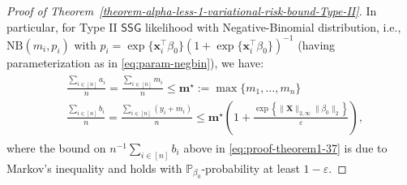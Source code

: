 \documentclass[12pt]{article}
\numberwithin{equation}{section}
\begin{document}
\begin{proof}[Proof of Theorem~\ref{theorem-alpha-less-1-variational-risk-bound-Type-II}]
In particular, for Type II $\mathsf{SSG}$ likelihood with Negative-Binomial distribution, i.e., $\mathrm{NB}(m_i, p_i)$ with $p_i = \exp\{\mathbf{x}_i^{\top}\beta_0\}(1 + \exp\{\mathbf{x}_i^{\top}\beta_0\})^{-1}$ (having parameterization as in \eqref{eq:param-negbin}), we have:
\begin{align}\label{eq:proof-theorem1-37}
    \begin{split}
        &\frac{\sum_{i\in[n]} a_i}{n} = \frac{\sum_{i\in [n]}m_i}{n} \leq \mathbf{m}^{\star} := \max\{m_1, \ldots, m_n\}\\
        &\frac{\sum_{i\in [n]}b_i}{n} = \frac{\sum_{i\in [n]}(y_i+m_i)}{n} \leq \mathbf{m}^{\star}\left(1 + \frac{\exp\left\{\lVert \mathbf{X}\rVert_{2, \infty}\lVert \beta_0\rVert_2\right\}}{\varepsilon}\right),
    \end{split}
\end{align}
where the bound on $n^{-1}\sum_{i\in [n]}b_i$ above in \eqref{eq:proof-theorem1-37} is due to Markov's inequality and holds with $\mathbb{P}_{\beta_0}$-probability at least $1-\varepsilon$.


\end{proof}
\end{document}
